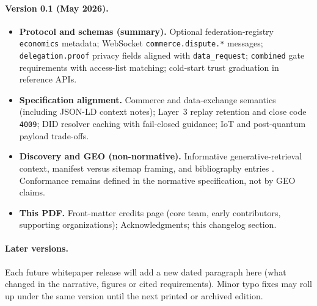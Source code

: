 \documentclass[12pt,a4paper]{article}
\begin{document}
\paragraph{Version 0.1 (May 2026).}
\begin{itemize}[leftmargin=*, itemsep=0.15em]
    \item \textbf{Protocol and schemas (summary).} Optional federation-registry \texttt{economics} metadata; WebSocket \texttt{commerce.dispute.*} messages; \texttt{delegation.proof} privacy fields aligned with \texttt{data\_request}; \texttt{combined} gate requirements with access-list matching; cold-start trust graduation in reference APIs.
    \item \textbf{Specification alignment.} Commerce and data-exchange semantics (including JSON-LD context notes); Layer~3 replay retention and close code \texttt{4009}; DID resolver caching with fail-closed guidance; IoT and post-quantum payload trade-offs.
    \item \textbf{Discovery and GEO (non-normative).} Informative generative-retrieval context, manifest versus sitemap framing, and bibliography entries \cite{ref33,ref34,ref35}. Conformance remains defined in the normative specification, not by GEO claims.
    \item \textbf{This PDF.} Front-matter credits page (core team, early contributors, supporting organizations); Acknowledgments; this changelog section.
\end{itemize}

\paragraph{Later versions.}
Each future whitepaper release will add a new dated paragraph here (what changed in the narrative, figures or cited requirements). Minor typo fixes may roll up under the same version until the next printed or archived edition.
\end{document}

